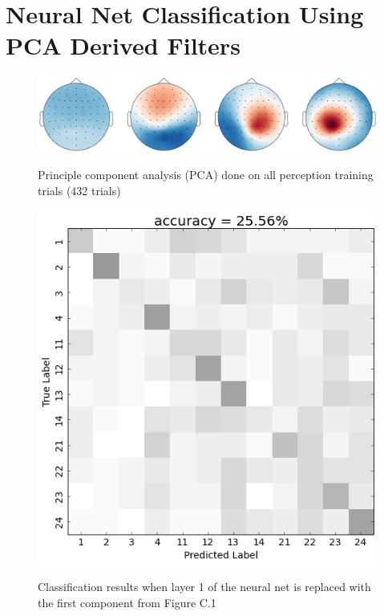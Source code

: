 \chapter{Neural Net Classification Using PCA Derived Filters} \label{appendix:PCAInvestigation}
\begin{figure}[htbp] 
  \begin{center}
   \includegraphics[width=.5\textwidth,keepaspectratio=true]{Figures/PCA_SVM}
   \\\vspace{-0.8em}
    \caption{Principle component analysis (PCA) done on all perception training trials (432 trials)}
    \label{fig:PCA_SVM}
  \end{center}
\end{figure}
\begin{figure}[htbp] 
  \begin{center}
    \includegraphics[scale=0.5]{Figures/PC0_confusion}
   \\\vspace{-0.8em}
    \caption{Classification results when layer 1 of the neural net is replaced with the first component from Figure C.1}
    \label{fig:PC0_confusion}
  \end{center}
\end{figure}
